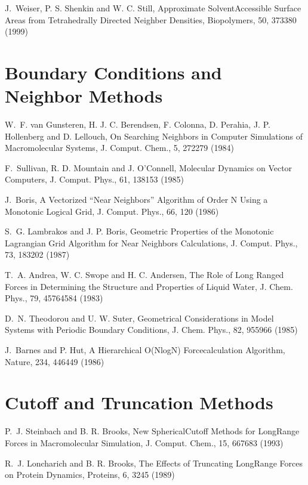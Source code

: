 \documentclass[letterpaper,11pt,english]{sphinxmanual}
\begin{document}
J. Weiser, P. S. Shenkin and W. C. Still, Approximate Solvent\sphinxhyphen{}Accessible Surface Areas from Tetrahedrally Directed Neighber Densities, Biopolymers, 50, 373\sphinxhyphen{}380 (1999)


\section{Boundary Conditions and Neighbor Methods}
\label{\detokenize{text/references:boundary-conditions-and-neighbor-methods}}
W. F. van Gunsteren, H. J. C. Berendsen, F. Colonna, D. Perahia, J. P. Hollenberg and D. Lellouch, On Searching Neighbors in Computer Simulations of Macromolecular Systems, J. Comput. Chem., 5, 272\sphinxhyphen{}279  (1984)

F. Sullivan, R. D. Mountain and J. O’Connell, Molecular Dynamics on Vector Computers, J. Comput. Phys., 61, 138\sphinxhyphen{}153 (1985)

J. Boris, A Vectorized “Near Neighbors” Algorithm of Order N Using a Monotonic Logical Grid, J. Comput. Phys., 66, 1\sphinxhyphen{}20 (1986)

S. G. Lambrakos and J. P. Boris, Geometric Properties of the Monotonic Lagrangian Grid Algorithm for Near Neighbors Calculations, J. Comput. Phys., 73, 183\sphinxhyphen{}202 (1987)

T. A. Andrea, W. C. Swope and H. C. Andersen, The Role of Long Ranged Forces in Determining the Structure and Properties of Liquid Water, J. Chem. Phys., 79, 4576\sphinxhyphen{}4584 (1983)

D. N. Theodorou and U. W. Suter, Geometrical Considerations in Model Systems with Periodic Boundary Conditions, J. Chem. Phys., 82, 955\sphinxhyphen{}966 (1985)

J. Barnes and P. Hut, A Hierarchical O(NlogN) Force\sphinxhyphen{}calculation Algorithm, Nature, 234, 446\sphinxhyphen{}449 (1986)


\section{Cutoff and Truncation Methods}
\label{\detokenize{text/references:cutoff-and-truncation-methods}}
P. J. Steinbach and B. R. Brooks, New Spherical\sphinxhyphen{}Cutoff Methods for Long\sphinxhyphen{}Range Forces in Macromolecular Simulation, J. Comput. Chem., 15, 667\sphinxhyphen{}683 (1993)

R. J. Loncharich and B. R. Brooks, The Effects of Truncating Long\sphinxhyphen{}Range Forces on Protein Dynamics, Proteins, 6, 32\sphinxhyphen{}45 (1989)
\end{document}
